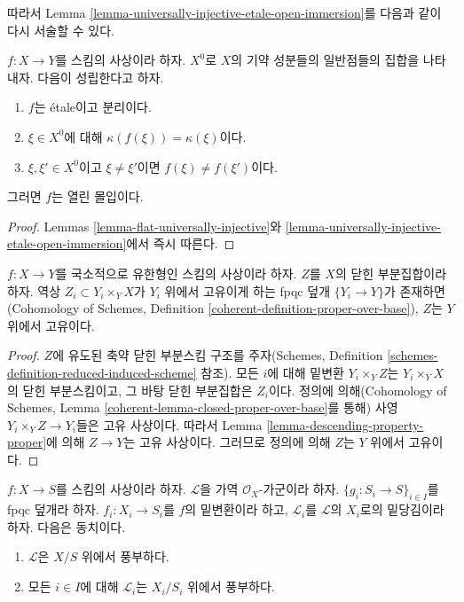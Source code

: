 \noindent
따라서 Lemma \ref{lemma-universally-injective-etale-open-immersion}를
다음과 같이 다시 서술할 수 있다.

\begin{lemma}
\label{lemma-characterize-open-immersion}
$f : X \to Y$를 스킴의 사상이라 하자. $X^0$로 $X$의 기약 성분들의
일반점들의 집합을 나타내자. 다음이 성립한다고 하자.
\begin{enumerate}
\item $f$는 \'etale이고 분리이다.
\item $\xi \in X^0$에 대해 $\kappa(f(\xi)) = \kappa(\xi)$이다.
\item $\xi, \xi' \in X^0$이고 $\xi \not = \xi'$이면
$f(\xi) \not = f(\xi')$이다.
\end{enumerate}
그러면 $f$는 열린 몰입이다.
\end{lemma}

\begin{proof}
Lemmas \ref{lemma-flat-universally-injective}와
\ref{lemma-universally-injective-etale-open-immersion}에서 즉시 따른다.
\end{proof}

\begin{lemma}
\label{lemma-descending-property-proper-over-base}
$f : X \to Y$를 국소적으로 유한형인 스킴의 사상이라 하자. $Z$를 $X$의
닫힌 부분집합이라 하자. 역상 $Z_i \subset Y_i \times_Y X$가 $Y_i$
위에서 고유이게 하는 fpqc 덮개 $\{Y_i \to Y\}$가 존재하면(Cohomology
of Schemes, Definition \ref{coherent-definition-proper-over-base}),
$Z$는 $Y$ 위에서 고유이다.
\end{lemma}

\begin{proof}
$Z$에 유도된 축약 닫힌 부분스킴 구조를 주자(Schemes, Definition
\ref{schemes-definition-reduced-induced-scheme} 참조). 모든 $i$에 대해
밑변환 $Y_i \times_Y Z$는 $Y_i \times_Y X$의 닫힌 부분스킴이고, 그
바탕 닫힌 부분집합은 $Z_i$이다. 정의에 의해(Cohomology of Schemes,
Lemma \ref{coherent-lemma-closed-proper-over-base}를 통해) 사영
$Y_i \times_Y Z \to Y_i$들은 고유 사상이다. 따라서 Lemma
\ref{lemma-descending-property-proper}에 의해 $Z \to Y$는 고유
사상이다. 그러므로 정의에 의해 $Z$는 $Y$ 위에서 고유이다.
\end{proof}

\begin{lemma}
\label{lemma-descending-property-ample}
$f : X \to S$를 스킴의 사상이라 하자. $\mathcal{L}$을 가역
$\mathcal{O}_X$-가군이라 하자. $\{g_i : S_i \to S\}_{i \in I}$를
fpqc 덮개라 하자. $f_i : X_i \to S_i$를 $f$의 밑변환이라 하고,
$\mathcal{L}_i$를 $\mathcal{L}$의 $X_i$로의 밑당김이라 하자. 다음은
동치이다.
\begin{enumerate}
\item $\mathcal{L}$은 $X/S$ 위에서 풍부하다.
\item 모든 $i \in I$에 대해 $\mathcal{L}_i$는 $X_i/S_i$ 위에서
풍부하다.
\end{enumerate}
\end{lemma}

